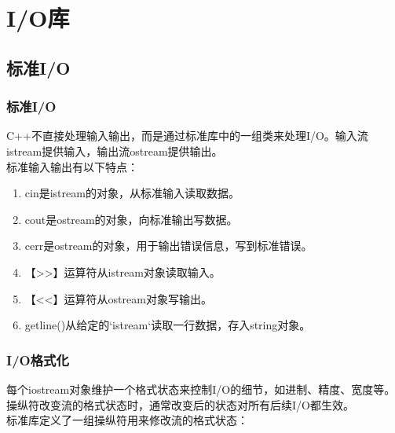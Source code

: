 \chapter{I/O库}

\section{标准I/O}

\subsection{标准I/O}

C++不直接处理输入输出，而是通过标准库中的一组类来处理I/O。输入流istream提供输入，输出流ostream提供输出。\\

标准输入输出有以下特点：

\begin{enumerate}
	\item cin是istream的对象，从标准输入读取数据。
	\item cout是ostream的对象，向标准输出写数据。
	\item cerr是ostream的对象，用于输出错误信息，写到标准错误。
	\item 【>>】运算符从istream对象读取输入。
	\item 【<<】运算符从ostream对象写输出。
	\item getline()从给定的`istream`读取一行数据，存入string对象。
\end{enumerate}

\vspace{0.5cm}

\subsection{I/O格式化}

每个iostream对象维护一个格式状态来控制I/O的细节，如进制、精度、宽度等。操纵符改变流的格式状态时，通常改变后的状态对所有后续I/O都生效。\\

标准库定义了一组操纵符用来修改流的格式状态：

